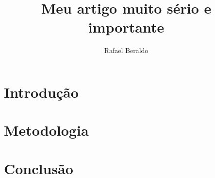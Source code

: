 \documentclass[11pt,a4paper,oneside]{article}
\title{Meu artigo muito sério e importante}
\author{Rafael Beraldo}
\begin{document}
\frenchspacing

\maketitle

\begin{abstract}
  \blindtext
\end{abstract}

\section{Introdução}
\blindtext

\section{Metodologia}
\blindtext

\section{Conclusão}
\blindtext
\end{document}
